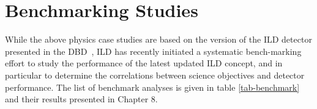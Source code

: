 %


%

\section{Benchmarking Studies}
While the above physics case studies are based on the version of the ILD detector presented in the DBD~\cite{ild:bib:ilddbd}, ILD has recently initiated a systematic bench-marking effort to study the performance of the latest updated ILD concept, and in particular to determine the correlations between science objectives and detector performance. The list of benchmark analyses is given in table \ref{tab-benchmark} and their results presented in Chapter 8. 

